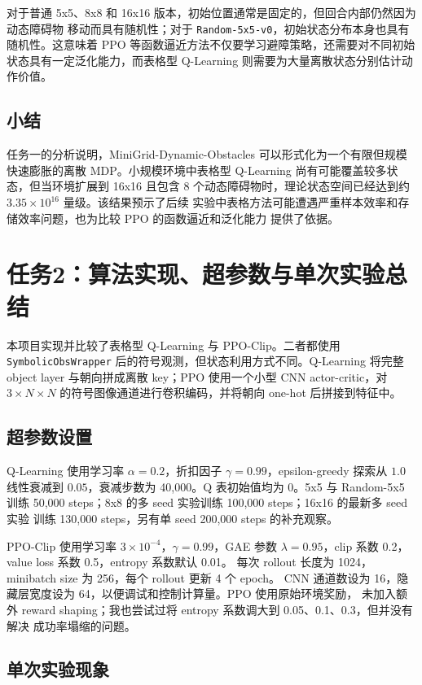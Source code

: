\documentclass[UTF8,a4paper,fontset=fandol]{ctexart}
\begin{document}
对于普通 5x5、8x8 和 16x16 版本，初始位置通常是固定的，但回合内部仍然因为动态障碍物
移动而具有随机性；对于 \texttt{Random-5x5-v0}，初始状态分布本身也具有随机性。这意味着
PPO 等函数逼近方法不仅要学习避障策略，还需要对不同初始状态具有一定泛化能力，而表格型
Q-Learning 则需要为大量离散状态分别估计动作价值。

\subsection{小结}

任务一的分析说明，MiniGrid-Dynamic-Obstacles 可以形式化为一个有限但规模快速膨胀的离散
MDP。小规模环境中表格型 Q-Learning 尚有可能覆盖较多状态，但当环境扩展到 16x16 且包含
8 个动态障碍物时，理论状态空间已经达到约 \(3.35 \times 10^{16}\) 量级。该结果预示了后续
实验中表格方法可能遭遇严重样本效率和存储效率问题，也为比较 PPO 的函数逼近和泛化能力
提供了依据。

\section{任务2：算法实现、超参数与单次实验总结}

本项目实现并比较了表格型 Q-Learning 与 PPO-Clip。二者都使用
\texttt{SymbolicObsWrapper} 后的符号观测，但状态利用方式不同。Q-Learning 将完整 object
layer 与朝向拼成离散 key；PPO 使用一个小型 CNN actor-critic，对 \(3 \times N \times N\)
的符号图像通道进行卷积编码，并将朝向 one-hot 后拼接到特征中。

\subsection{超参数设置}

Q-Learning 使用学习率 \(\alpha=0.2\)，折扣因子 \(\gamma=0.99\)，epsilon-greedy 探索从
\(1.0\) 线性衰减到 \(0.05\)，衰减步数为 40,000。Q 表初始值均为 0。5x5 与 Random-5x5
训练 50,000 steps；8x8 的多 seed 实验训练 100,000 steps；16x16 的最新多 seed 实验
训练 130,000 steps，另有单 seed 200,000 steps 的补充观察。

PPO-Clip 使用学习率 \(3\times 10^{-4}\)，\(\gamma=0.99\)，GAE 参数
\(\lambda=0.95\)，clip 系数 0.2，value loss 系数 0.5，entropy 系数默认 0.01。
每次 rollout 长度为 1024，minibatch size 为 256，每个 rollout 更新 4 个 epoch。
CNN 通道数设为 16，隐藏层宽度设为 64，以便调试和控制计算量。PPO 使用原始环境奖励，
未加入额外 reward shaping；我也尝试过将 entropy 系数调大到 0.05、0.1、0.3，但并没有解决
成功率塌缩的问题。

\subsection{单次实验现象}
\end{document}
